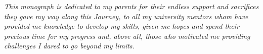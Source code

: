 

    \begin{dedicatoria}
       \vspace*{\fill}
       \centering
       \noindent
       \textit{ This monograph is dedicated to my parents for their endless support and sacrifices they gave my way along this Journey, to all my university mentors whom have provided me knowledge to develop my skills, given me hopes and spend their precious time for my progress and, above all, those who motivated me providing challenges I dared to go beyond my limits. } \vspace*{\fill}
    \end{dedicatoria}


